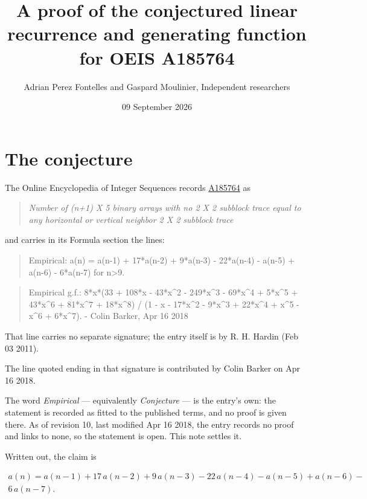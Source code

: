 \documentclass[11pt]{article}
\title{A proof of the conjectured linear recurrence and generating function for OEIS A185764}
\author{Adrian Perez Fontelles and Gaspard Moulinier, Independent researchers}
\date{09 September 2026}
\theoremstyle{definition}
\begin{document}
\maketitle
\section{The conjecture}

The Online Encyclopedia of Integer Sequences records \href{https://oeis.org/A185764}{A185764} as

\begin{quote}\itshape Number of (n+1) X 5 binary arrays with no 2 X 2 subblock trace equal to any horizontal or vertical neighbor 2 X 2 subblock trace\end{quote}

and carries in its Formula section the lines:

\begin{quote}\ttfamily Empirical: a(n) = a(n-1) + 17*a(n-2) + 9*a(n-3) - 22*a(n-4) - a(n-5) + a(n-6) - 6*a(n-7) for n>9.\end{quote}

\begin{quote}\ttfamily Empirical g.f.: 8*x*(33 + 108*x - 43*x\textasciicircum{}2 - 249*x\textasciicircum{}3 - 69*x\textasciicircum{}4 + 5*x\textasciicircum{}5 + 43*x\textasciicircum{}6 + 81*x\textasciicircum{}7 + 18*x\textasciicircum{}8) / (1 - x - 17*x\textasciicircum{}2 - 9*x\textasciicircum{}3 + 22*x\textasciicircum{}4 + x\textasciicircum{}5 - x\textasciicircum{}6 + 6*x\textasciicircum{}7). - Colin Barker, Apr 16 2018\end{quote}

That line carries no separate signature; the entry itself is by R. H. Hardin (Feb 03 2011).

The line quoted ending in that signature is contributed by Colin Barker on Apr 16 2018.

The word {\itshape Empirical} --- equivalently {\itshape Conjecture} --- is the entry's own: the statement is recorded as fitted to the published terms, and no proof is given there. As of revision 10, last modified Apr 16 2018, the entry records no proof and links to none, so the statement is open. This note settles it.

Written out, the claim is

\begin{multline*} a(n) = a(n-1) + 17\,a(n-2) + 9\,a(n-3) - 22\,a(n-4) - a(n-5) + a(n-6) - \\ 6\,a(n-7). \end{multline*}
\end{document}
